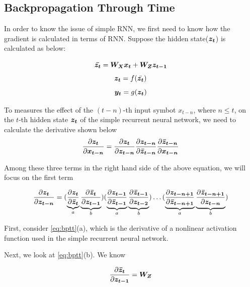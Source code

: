 \subsection{Backpropagation Through Time}
In order to know the issue of simple RNN, we first need to know how the gradient is calculated in terms of RNN. Suppose the hidden state($\vect{z_t}$) is calculated as below:

\[\vect{\bar{z_t}} = \matr{W_X} \vect{x_t} + \matr{W_Z} \vect{z_{t-1}}\]
\[\vect{z_t} = f(\bar{\vect{z_t}})\]
\[\vect{y_t} = g(\vect{z_t})\]

To measures the effect of the $(t-n)$-th input symbot $x_{t-n}$, where $n\leq{t}$, on the $t$-th hidden state $\vect{z_t}$ of the simple recurrent neural network, we need to calculate the derivative shown below
\[\frac{\partial \vect{z_t}}{\partial \vect{x_{t-n}}}=\frac{\partial \vect{z_t}}{\partial \vect{z_{t-n}}}\frac{\partial \vect{z_{t-n}}}{\partial \vect{\bar{z}_{t-n}}}\frac{\partial \vect{\bar{z}_{t-n}}}{\partial \vect{x_{t-n}}}\]

Among these three terms in the right hand side of the above equation, we will focus on the first term

\begin{equation} \label{eq:bptt}
\frac{\partial \vect{z_t}}{\partial \vect{z_{t-n}}} = (\underbrace{\frac{\partial \vect{z_t}}{\partial \vect{\bar{z}_{t}}}}_{a}\underbrace{\frac{\partial \vect{\bar{z}_{t}}}{\partial \vect{z_{t-1}}}}_{b})
(\underbrace{\frac{\partial \vect{z_{t-1}}}{\partial \vect{\bar{z}_{t-1}}}}_{a}\underbrace{\frac{\partial \vect{\bar{z}_{t-1}}}{\partial \vect{z_{t-2}}}}_{b}) \ldots 
(\underbrace{\frac{\partial \vect{z_{t-n+1}}}{\partial \vect{\bar{z}_{t-n+1}}}}_{a}\underbrace{\frac{\partial \vect{\bar{z}_{t-n+1}}}{\partial \vect{z_{t-n}}}}_{b})
\end{equation}

First, consider \cref{eq:bptt}(a), which is the derivative of a nonlinear activation function used in the simple recurrent neural network.

Next, we look at \cref{eq:bptt}(b). We know

\[\frac{\partial \vect{\bar{z}_{t}}}{\partial \vect{z_{t-1}}} = \matr{W_Z}\]

